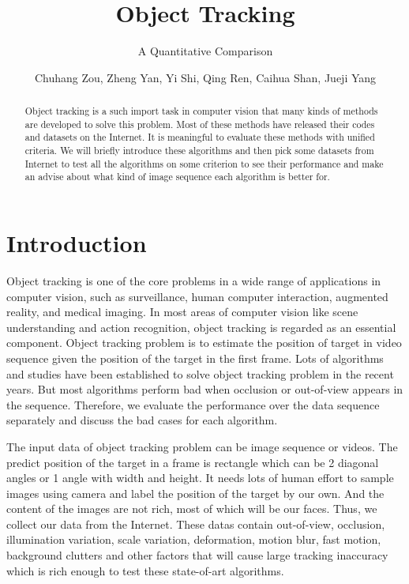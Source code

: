 \documentclass{acm_proc_article-sp}
\begin{document}
\title{Object Tracking}
\subtitle{A Quantitative Comparison}
\author{Chuhang Zou, Zheng Yan, Yi Shi, Qing Ren, Caihua Shan, Jueji Yang}
\maketitle

\begin{abstract}
Object tracking is a such import task in computer vision that many kinds of methods are developed to solve this problem. Most of these methods have released their codes and datasets on the Internet. It is meaningful to evaluate these methods with unified criteria. We will briefly introduce these algorithms and then pick some datasets from Internet to test all the algorithms on some criterion to see their performance and make an advise about what kind of image sequence each algorithm is better for.
\end{abstract}

\section{Introduction}
Object tracking is one of the core problems in a wide range of applications in computer vision, such as surveillance, human computer interaction, augmented reality, and medical imaging.
In most areas of computer vision like scene understanding and action recognition, object tracking is regarded as an essential component.
Object tracking problem is to estimate the position of target in video sequence given the position of the target in the first frame.
Lots of algorithms and studies have been established to solve object tracking problem in the recent years.
But most algorithms perform bad when occlusion or out-of-view appears in the sequence.
Therefore, we evaluate the performance over the data sequence separately and discuss the bad cases for each algorithm.

The input data of object tracking problem can be image sequence or videos.
The predict position of the target in a frame is rectangle which can be 2 diagonal angles or 1 angle with width and height.
It needs lots of human effort to sample images using camera and label the position of the target by our own.
And the content of the images are not rich, most of which will be our faces.
Thus, we collect our data from the Internet\cite{dataset}.
These datas contain out-of-view, occlusion, illumination variation, scale variation, deformation, motion blur, fast motion, background clutters and other factors that will cause large tracking inaccuracy which is rich enough to test these state-of-art algorithms.
\end{document}
